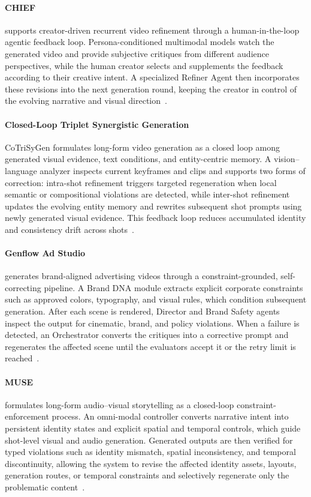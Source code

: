\paragraph{CHIEF}
 supports creator-driven recurrent video refinement through a human-in-the-loop agentic feedback loop. Persona-conditioned multimodal models watch the generated video and provide subjective critiques from different audience perspectives, while the human creator selects and supplements the feedback according to their creative intent. A specialized Refiner Agent then incorporates these revisions into the next generation round, keeping the creator in control of the evolving narrative and visual direction~\cite{avg260618591}.

\paragraph{Closed-Loop Triplet Synergistic Generation}
CoTriSyGen formulates long-form video generation as a closed loop among generated visual evidence, text conditions, and entity-centric memory. A vision--language analyzer inspects current keyframes and clips and supports two forms of correction: intra-shot refinement triggers targeted regeneration when local semantic or compositional violations are detected, while inter-shot refinement updates the evolving entity memory and rewrites subsequent shot prompts using newly generated visual evidence. This feedback loop reduces accumulated identity and consistency drift across shots~\cite{avg260616184}.

\paragraph{Genflow Ad Studio}
 generates brand-aligned advertising videos through a constraint-grounded, self-correcting pipeline. A Brand DNA module extracts explicit corporate constraints such as approved colors, typography, and visual rules, which condition subsequent generation. After each scene is rendered, Director and Brand Safety agents inspect the output for cinematic, brand, and policy violations. When a failure is detected, an Orchestrator converts the critiques into a corrective prompt and regenerates the affected scene until the evaluators accept it or the retry limit is reached~\cite{avg260516748}.

\paragraph{MUSE}
 formulates long-form audio--visual storytelling as a closed-loop constraint-enforcement process. An omni-modal controller converts narrative intent into persistent identity states and explicit spatial and temporal controls, which guide shot-level visual and audio generation. Generated outputs are then verified for typed violations such as identity mismatch, spatial inconsistency, and temporal discontinuity, allowing the system to revise the affected identity assets, layouts, generation routes, or temporal constraints and selectively regenerate only the problematic content~\cite{avg260203028}.

